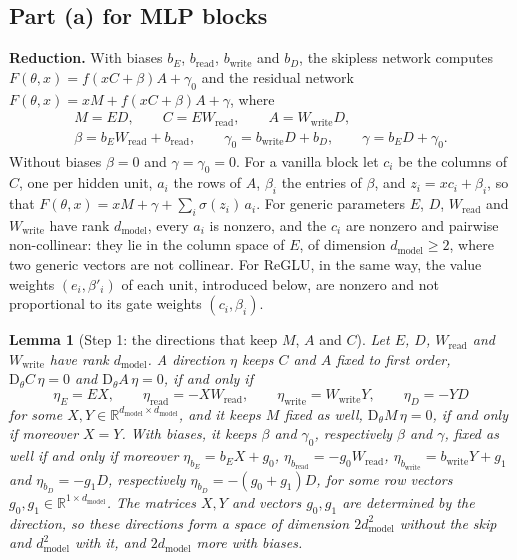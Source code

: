 \documentclass[10pt]{article}
\newtheorem{lemma}[theorem]{Lemma}
\theoremstyle{definition}
\theoremstyle{remark}
\newcommand{\R}{\mathbb{R}}
\newcommand{\Wread}{W_{\mathrm{read}}}
\newcommand{\Wwrite}{W_{\mathrm{write}}}
\newcommand{\dm}{d_{\mathrm{model}}}
\newcommand{\Der}{\mathrm{D}}
\newcommand{\para}[1]{\smallskip\noindent\textbf{#1}\hspace{0.5em}}
\begin{document}
\subsection*{Part (a) for MLP blocks}

\para{Reduction.} With biases $b_E$, $b_{\mathrm{read}}$, $b_{\mathrm{write}}$ and $b_D$, the skipless network computes $F(\theta, x) = f(xC + \beta)A + \gamma_0$ and the residual network $F(\theta, x) = xM + f(xC + \beta)A + \gamma$, where
\begin{gather*}
M = ED,\qquad C = E\Wread,\qquad A = \Wwrite D,\\ \beta = b_E\Wread + b_{\mathrm{read}},\qquad \gamma_0 = b_{\mathrm{write}}D + b_D,\qquad \gamma = b_ED + \gamma_0 .
\end{gather*}
Without biases $\beta = 0$ and $\gamma = \gamma_0 = 0$. For a vanilla block let $c_i$ be the columns of $C$, one per hidden unit, $a_i$ the rows of $A$, $\beta_i$ the entries of $\beta$, and $z_i = xc_i + \beta_i$, so that $F(\theta, x) = xM + \gamma + \sum_i \sigma(z_i)\,a_i$. For generic parameters $E$, $D$, $\Wread$ and $\Wwrite$ have rank $\dm$, every $a_i$ is nonzero, and the $c_i$ are nonzero and pairwise non-collinear: they lie in the column space of $E$, of dimension $\dm \ge 2$, where two generic vectors are not collinear. For ReGLU, in the same way, the value weights $(e_i, \beta'_i)$ of each unit, introduced below, are nonzero and not proportional to its gate weights $(c_i, \beta_i)$.

\begin{lemma}[Step 1: the directions that keep $M$, $A$ and $C$]\label{lem:fact}
Let $E$, $D$, $\Wread$ and $\Wwrite$ have rank $\dm$. A direction $\eta$ keeps $C$ and $A$ fixed to first order, $\Der_\theta C\,\eta = 0$ and $\Der_\theta A\,\eta = 0$, if and only if
\[
\eta_E = EX,\qquad \eta_{\mathrm{read}} = -X\Wread,\qquad \eta_{\mathrm{write}} = \Wwrite Y,\qquad \eta_D = -YD
\]
for some $X, Y \in \R^{\dm\times\dm}$, and it keeps $M$ fixed as well, $\Der_\theta M\,\eta = 0$, if and only if moreover $X = Y$. With biases, it keeps $\beta$ and $\gamma_0$, respectively $\beta$ and $\gamma$, fixed as well if and only if moreover $\eta_{b_E} = b_EX + g_0$, $\eta_{b_{\mathrm{read}}} = -g_0\Wread$, $\eta_{b_{\mathrm{write}}} = b_{\mathrm{write}}Y + g_1$ and $\eta_{b_D} = -g_1D$, respectively $\eta_{b_D} = -(g_0 + g_1)D$, for some row vectors $g_0, g_1 \in \R^{1\times\dm}$. The matrices $X, Y$ and vectors $g_0, g_1$ are determined by the direction, so these directions form a space of dimension $2\dm^2$ without the skip and $\dm^2$ with it, and $2\dm$ more with biases.
\end{lemma}
\end{document}
